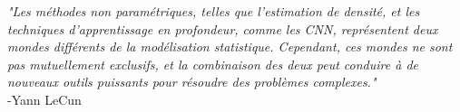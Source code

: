 
\vspace{3cm}

\begin{center}


\vspace{3cm}

\textit{\large "Les méthodes non paramétriques, telles que l'estimation de densité, et les techniques d'apprentissage en profondeur, comme les CNN, représentent deux mondes différents de la modélisation statistique. Cependant, ces mondes ne sont pas mutuellement exclusifs, et la combinaison des deux peut conduire à de nouveaux outils puissants pour résoudre des problèmes complexes."} \\ -Yann LeCun

\newpage
\thispagestyle{empty}
\null\newpage



\end{center}